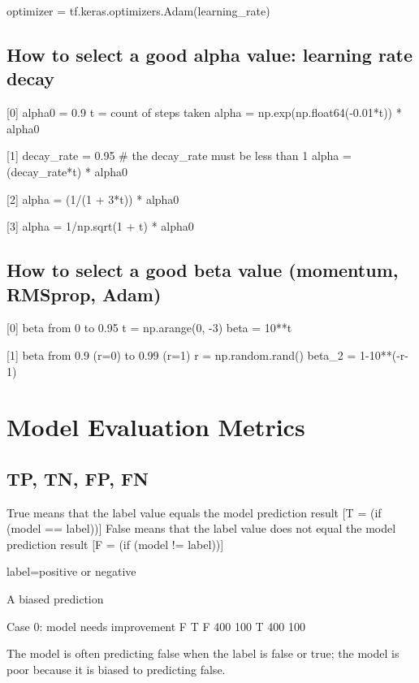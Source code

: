 \documentclass[11pt, onecolumn]{article}
\begin{document}
optimizer = tf.keras.optimizers.Adam(learning_rate)



\subsection{How to select a good alpha value: learning rate decay}
[0]
alpha0 = 0.9
t = count of steps taken
alpha = np.exp(np.float64(-0.01*t)) * alpha0

[1]
decay_rate = 0.95 #  the decay_rate must be less than 1
alpha = (decay_rate*t) * alpha0

[2]
alpha = (1/(1 + 3*t)) * alpha0

[3]
alpha = 1/np.sqrt(1 + t) * alpha0


\subsection{How to select a good beta value (momentum, RMSprop, Adam)}
[0] beta from 0 to 0.95
t = np.arange(0, -3)
beta = 10**t

[1] beta from 0.9 (r=0) to 0.99 (r=1)
r = np.random.rand()
beta_2 = 1-10**(-r-1)







\section{Model Evaluation Metrics}



\subsection{TP, TN, FP, FN}

True means that the label value equals the model prediction result [T = (if (model == label))]
False means that the label value does not equal the model prediction result [F = (if (model != label))]

label=positive or negative



A biased prediction

Case 0: model needs improvement
	F	T
F	400	100
T	400	100

The model is often predicting false when the label is false or true; the model is poor because it is biased to predicting false.
\end{document}
